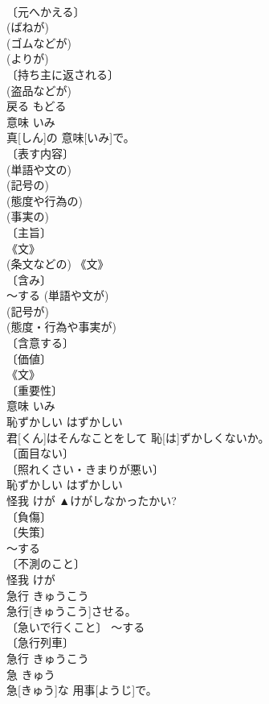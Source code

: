 \documentclass[8pt]{extreport}
\begin{document}
\begin{CJK}{UTF8}{min}
\\	〔元へかえる〕 
\\	(ばねが) 
\\	(ゴムなどが) 
\\	(よりが) 
\\	〔持ち主に返される〕 
\\	(盗品などが) 
\\	戻る	もどる	
\\	意味	いみ	
\\	真[しん]の 意味[いみ]で。	
\\	〔表す内容〕 
\\	(単語や文の) 
\\	(記号の) 
\\	(態度や行為の) 
\\	(事実の) 
\\	〔主旨〕 
\\	《文》 
\\	(条文などの) 《文》 
\\	〔含み〕 
\\	～する (単語や文が) 
\\	(記号が) 
\\	(態度・行為や事実が) 
\\	〔含意する〕 
\\	〔価値〕 
\\	《文》 
\\	〔重要性〕 
\\	意味	いみ	
\\	恥ずかしい	はずかしい	
\\	君[くん]はそんなことをして 恥[は]ずかしくないか。	
\\	〔面目ない〕 
\\	〔照れくさい・きまりが悪い〕 
\\	恥ずかしい	はずかしい	
\\	怪我	けが	▲けがしなかったかい?	
\\	〔負傷〕 
\\	〔失策〕 
\\	～する 
\\	〔不測のこと〕 
\\	怪我	けが	
\\	急行	きゅうこう	
\\	急行[きゅうこう]させる。	
\\	〔急いで行くこと〕 ～する 
\\	〔急行列車〕 
\\	[⇒きゅうこうれっしゃ]	急行	きゅうこう	
\\	急	きゅう	
\\	急[きゅう]な 用事[ようじ]で。	

\end{CJK}
\end{document}
